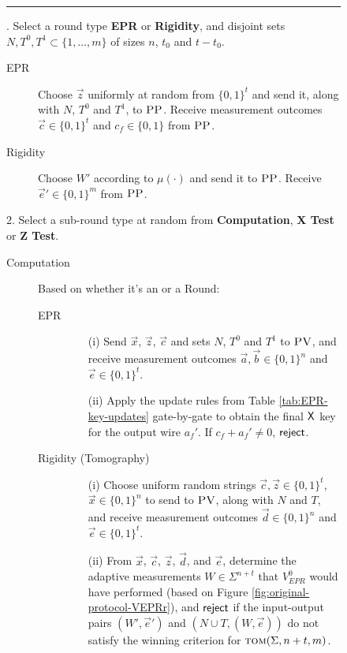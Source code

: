 \documentclass[11pt]{article}
\theoremstyle{remark}
\theoremstyle{definition}
\newcommand{\tom}{\textsc{tom}}
\newcommand{\pv}{\textsc{PV}}
\newcommand{\pp}{\textsc{PP}}
\begin{document}
\begin{figure}[H]
\rule[1ex]{16.5cm}{0.5pt}
\vspace{-20pt}
. Select a round type \textbf{EPR} or \textbf{Rigidity}, and disjoint sets $N,T^0,T^1\subset \{1,\ldots,m\}$ of sizes $n$, $t_0$ and $t-t_0$.  
\begin{description}
\item[EPR] Choose $\vec{z}$ uniformly at random from $\{0,1\}^t$ and send it, along with $N$, $T^0$ and $T^1$, to $\pp$. Receive measurement outcomes $\vec{c}\in\{0,1\}^t$ and $c_f\in\{0,1\}$ from $\pp$.
\item[Rigidity] Choose $W'$ according to $\mu(\cdot)$ and send it to $\pp$. Receive $\vec{e}'\in \{0,1\}^m$ from $\pp$. 
\end{description}
2. Select a sub-round type at random from \textbf{Computation}, \textbf{X Test} or \textbf{Z Test}. 
\begin{description}
\item[Computation] Based on whether it's an  or a  Round:
	\begin{description}
	\item[EPR]
		\begin{enumerate}
		\item[(i)] Send $\vec{x}$, $\vec{z}$, $\vec{c}$ and sets $N$, $T^0$ and $T^1$ to $\pv$, and receive measurement outcomes $\vec{a},\vec{b}\in \{0,1\}^n$ and $\vec{e}\in\{0,1\}^t$.
		\item[(ii)] Apply the update rules from Table \ref{tab:EPR-key-updates} gate-by-gate to obtain the final $\sf X$ key for the output wire $a_f'$. If $c_f+a_f'\neq 0$, $\sf reject$. 
		\end{enumerate}
	\item[Rigidity (Tomography)]
		\begin{enumerate}
		\item[(i)] Choose uniform random strings $\vec{c},\vec{z}\in\{0,1\}^t$, $\vec{x} \in \{0,1\}^n$ 
		to send to $\pv$, along with $N$ and $T$, and receive measurement outcomes $\vec{d}\in \{0,1\}^n$ and $\vec{e}\in\{0,1\}^t$. 
		\item[(ii)]
		From $\vec{x}$, $\vec{c}$, $\vec{z}$, $\vec{d}$, and $\vec{e}$, determine the adaptive measurements $W\in\Sigma^{n+t}$ that $V_{EPR}^0$ would have performed (based on Figure \ref{fig:original-protocol-VEPRr}), and $\sf reject$ if the input-output pairs $(W',\vec{e}')$ and $(N\cup T,(W,\vec{e}))$ do not satisfy the winning criterion for $\tom(\Sigma,n+t,m)$.

\end{enumerate}
\end{description}
\end{description}
\end{figure}
\end{document}
